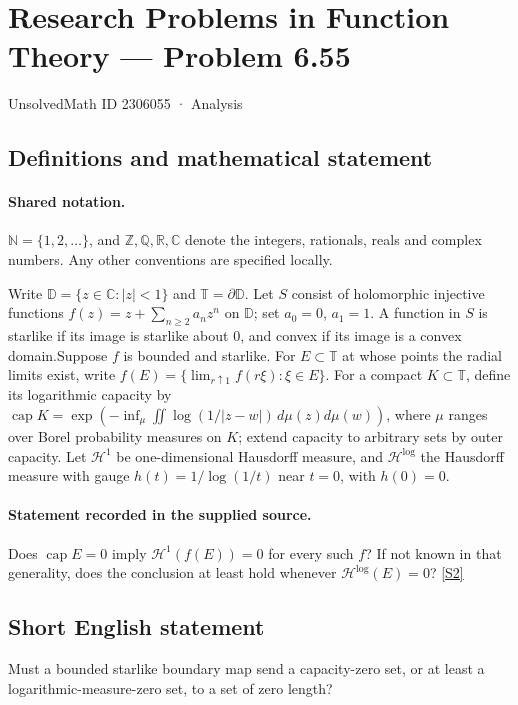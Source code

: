 \documentclass[11pt]{article}
\newcommand{\sref}[2]{\hyperlink{source:#1:#2}{[S#2]}}
\begin{document}
\setcounter{section}{2306054}
\section{Research Problems in Function Theory — Problem 6.55}\label{2306055}
{\small\sffamily UnsolvedMath ID 2306055 · Analysis}
\subsection{Definitions and mathematical statement}

\paragraph{Shared notation.}$\mathbb N=\{1,2,\ldots\}$, and $\mathbb Z,\mathbb Q,\mathbb R,\mathbb C$ denote the integers, rationals, reals and complex numbers. Any other conventions are specified locally.


Write $\mathbb D=\{z\in\mathbb C:|z|<1\}$ and $\mathbb T=\partial\mathbb D$. Let $S$ consist of holomorphic injective functions $f(z)=z+\sum_{n\ge2}a_nz^n$ on $\mathbb D$; set $a_0=0$, $a_1=1$. A function in $S$ is starlike if its image is starlike about $0$, and convex if its image is a convex domain.Suppose $f$ is bounded and starlike. For $E\subset\mathbb T$ at whose points the radial limits exist, write $f(E)=\{\lim_{r\uparrow1}f(r\xi):\xi\in E\}$. For a compact $K\subset\mathbb T$, define its logarithmic capacity by $\operatorname{cap}K=\exp(-\inf_\mu\iint\log(1/|z-w|)\,d\mu(z)d\mu(w))$, where $\mu$ ranges over Borel probability measures on $K$; extend capacity to arbitrary sets by outer capacity. Let $\mathcal H^1$ be one-dimensional Hausdorff measure, and $\mathcal H^{\log}$ the Hausdorff measure with gauge $h(t)=1/\log(1/t)$ near $t=0$, with $h(0)=0$.
\paragraph{Statement recorded in the supplied source.}
Does $\operatorname{cap}E=0$ imply $\mathcal H^1(f(E))=0$ for every such $f$? If not known in that generality, does the conclusion at least hold whenever $\mathcal H^{\log}(E)=0$? \sref{2306055}{2}
\subsection{Short English statement}
Must a bounded starlike boundary map send a capacity-zero set, or at least a logarithmic-measure-zero set, to a set of zero length?
\end{document}
